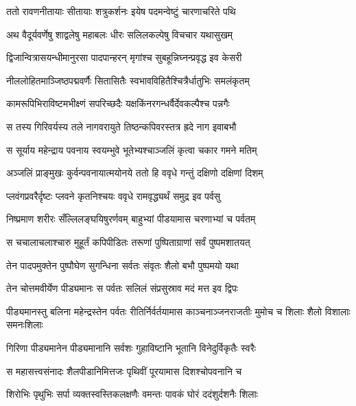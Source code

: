 

\twolineshloka
{ततो रावणनीतायाः सीतायाः शत्रुकर्शनः}
{इयेष पदमन्वेष्टुं चारणाचरिते पथि} %

\twolineshloka
{अथ वैदूर्यवर्णेषु शाद्वलेषु महाबलः}
{धीरः सलिलकल्पेषु विचचार यथासुखम्} %

\twolineshloka
{द्विजान्वित्रासयन्धीमानुरसा पादपान्हरन्}
{मृगांश्च सुबहून्निघ्नन्प्रवृद्ध इव केसरी} %

\twolineshloka
{नीललोहितमाञ्जिष्ठपद्मवर्णैः सितासितैः}
{स्वभावविहितैश्चित्रैर्धातुभिः समलंकृतम्} %

\twolineshloka
{कामरूपिभिराविष्टमभीक्ष्णं सपरिच्छदैः}
{यक्षकिंनरगन्धर्वैर्देवकल्पैश्च पन्नगैः} %

\twolineshloka
{स तस्य गिरिवर्यस्य तले नागवरायुते}
{तिष्ठन्कपिवरस्तत्र ह्रदे नाग इवाबभौ} %

\twolineshloka
{स सूर्याय महेन्द्राय पवनाय स्वयम्भुवे}
{भूतेभ्यश्चाञ्जलिं कृत्वा चकार गमने मतिम्} %

\twolineshloka
{अञ्जलिं प्राङ्मुखः कुर्वन्पवनायात्मयोनये}
{ततो हि ववृधे गन्तुं दक्षिणो दक्षिणां दिशम्} %

\twolineshloka
{प्लवंगप्रवरैर्दृष्टः प्लवने कृतनिश्चयः}
{ववृधे रामवृद्ध्यर्थं समुद्र इव पर्वसु} %

\twolineshloka
{निष्प्रमाण शरीरः सँल्लिलङ्घयिषुरर्णवम्}
{बाहुभ्यां पीडयामास चरणाभ्यां च पर्वतम्} %

\twolineshloka
{स चचालाचलाश्चारु मुहूर्तं कपिपीडितः}
{तरूणां पुष्पिताग्राणां सर्वं पुष्पमशातयत्} %

\twolineshloka
{तेन पादपमुक्तेन पुष्पौघेण सुगन्धिना}
{सर्वतः संवृतः शैलो बभौ पुष्पमयो यथा} %

\twolineshloka
{तेन चोत्तमवीर्येण पीड्यमानः स पर्वतः}
{सलिलं संप्रसुस्राव मदं मत्त इव द्विपः} %

\threelineshloka
{पीड्यमानस्तु बलिना महेन्द्रस्तेन पर्वतः}
{रीतिर्निर्वर्तयामास काञ्चनाञ्जनराजतीः}
{मुमोच च शिलाः शैलो विशालाः समनःशिलाः} %

\twolineshloka
{गिरिणा पीड्यमानेन पीड्यमानानि सर्वशः}
{गुहाविष्टानि भूतानि विनेदुर्विकृतैः स्वरैः} %

\twolineshloka
{स महासत्त्वसंनादः शैलपीडानिमित्तजः}
{पृथिवीं पूरयामास दिशश्चोपवनानि च} %

\twolineshloka
{शिरोभिः पृथुभिः सर्पा व्यक्तस्वस्तिकलक्षणैः}
{वमन्तः पावकं घोरं ददंशुर्दशनैः शिलाः} %

